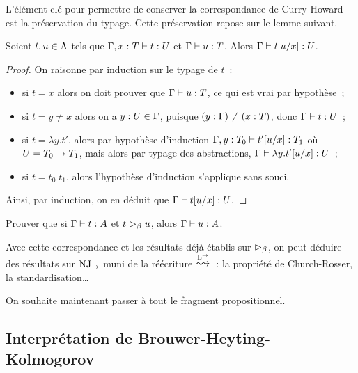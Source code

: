 L'élément clé pour permettre de conserver la correspondance de Curry-Howard
est la préservation du typage. Cette préservation repose sur le lemme suivant.

\begin{lemma}
  Soient $t, u \in \Lambda$ tels que $\Gamma, x : T \mathrel{\vdash} t : U$
  et $\Gamma\vdash u : T$. Alors $\Gamma\mathrel{\vdash} t[u/x] : U$.
\end{lemma}

\begin{proof}
  On raisonne par induction sur le typage de $t$~:
  \begin{itemize}
  \item si $t = x$ alors on doit prouver que $\Gamma\mathrel{\vdash} u : T$, ce
    qui est vrai par hypothèse~;
  \item si $t = y \neq x$ alors on a $y : U \in \Gamma$, puisque
    $(y : \Gamma) \neq (x : T)$, donc $\Gamma\vdash t : U$~;
  \item si $t = \lambda y.t'$, alors par hypothèse d'induction
    $\Gamma, y : T_0 \mathrel{\vdash} t'[u/x] : T_1$ où
    $U = T_0 \to T_1$, mais alors par typage des
    abstractions, $\Gamma\mathrel{\vdash} \lambda y.t'[u/x] : U$~;
  \item si $t = t_0\;t_1$, alors l'hypothèse d'induction s'applique sans
    souci.
  \end{itemize}
  Ainsi, par induction, on en déduit que $\Gamma\mathrel{\vdash} t[u/x] : U$.
\end{proof}

\begin{exercise}
  Prouver que si $\Gamma\mathrel{\vdash} t : A$ et $t \mathrel{\rhd_{\beta}} u$, alors
  $\Gamma\mathrel{\vdash} u : A$.
\end{exercise}

Avec cette correspondance et les résultats déjà établis sur $\mathrel{\rhd_{\beta}}$, on peut
déduire des résultats sur $\operatorname{NJ}_\to$ muni de la réécriture
$\LCutP{\to}$~: la propriété de Church-Rosser, la standardisation\ldots

On souhaite maintenant passer à tout le fragment propositionnel.

\subsection[Interprétation BHK]{Interprétation de Brouwer-Heyting-Kolmogorov}

